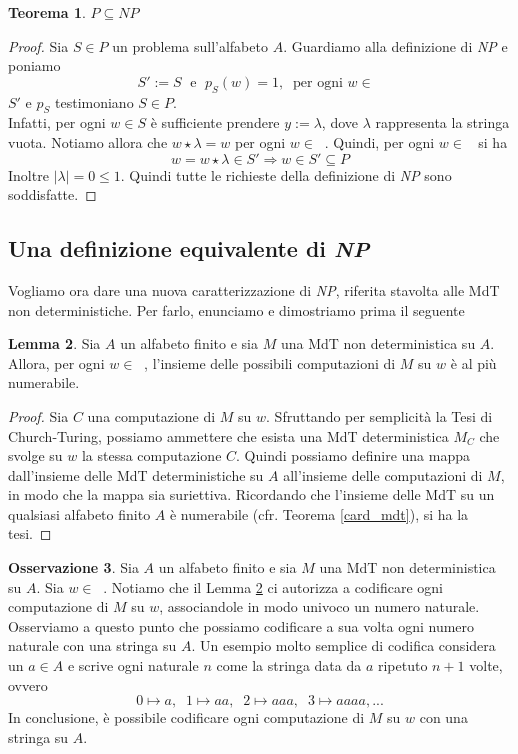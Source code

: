 \documentclass[12pt,a4paper]{report}
\theoremstyle{definition}
\newtheorem{teo}{Teorema}[section]  %
\newtheorem{oss}[teo]{Osservazione}  %
\newtheorem{lemma}[teo]{Lemma}  %
\DeclareMathOperator{\aaa}{\textit{A}^{\star}}
\begin{document}
\begin{teo}\label{P_in_NP}
$P \subseteq NP$
\begin{proof}
Sia $S \in P$ un problema sull'alfabeto $A$. Guardiamo alla definizione di \emph{NP} e poniamo
$$S':=S \; \text{ e } \; p_S(w)=1, \; \; \text{per ogni } w \in \aaa$$
$S'$ e $p_S$ testimoniano $S \in P$.\\
Infatti, per ogni $w \in S$ è sufficiente prendere $y:= \lambda$, dove $\lambda$ rappresenta la stringa vuota. Notiamo allora che $w \star \lambda = w$ per ogni $w \in \aaa$. Quindi, per ogni $w \in \aaa$ si ha 
$$w=w \star \lambda \in S' \Longrightarrow w \in S' \subseteq P$$ 
Inoltre $|\lambda|=0 \leq 1$. Quindi tutte le richieste della definizione di \emph{NP} sono soddisfatte.
\end{proof}
\end{teo}


\subsection{Una definizione equivalente di \emph{NP}}

Vogliamo ora dare una nuova caratterizzazione di \emph{NP}, riferita stavolta alle MdT non deterministiche. Per farlo, enunciamo e dimostriamo prima il seguente

\begin{lemma}\label{codifica}
Sia $A$ un alfabeto finito e sia $M$ una MdT non deterministica su $A$. Allora, per ogni $w \in \aaa$, l'insieme delle possibili computazioni di $M$ su $w$ è al più numerabile.
\begin{proof}
Sia $C$ una computazione di $M$ su $w$. Sfruttando per semplicità la Tesi di Church-Turing, possiamo ammettere che esista una MdT deterministica $M_C$ che svolge su $w$ la stessa computazione $C$. Quindi possiamo definire una mappa dall'insieme delle MdT deterministiche su $A$ all'insieme delle computazioni di $M$, in modo che la mappa sia suriettiva. Ricordando che l'insieme delle MdT su un qualsiasi alfabeto finito $A$ è numerabile (cfr. Teorema \ref{card_mdt}), si ha la tesi.
\end{proof}
\end{lemma}

\begin{oss}\label{oss_codifica}
Sia $A$ un alfabeto finito e sia $M$ una MdT non deterministica su $A$. Sia $w \in \aaa$. Notiamo che il Lemma \ref{codifica} ci autorizza a codificare ogni computazione di $M$ su $w$, associandole in modo univoco un numero naturale. Osserviamo a questo punto che possiamo codificare a sua volta ogni numero naturale con una stringa su $A$. Un esempio molto semplice di codifica considera un $a \in A$ e scrive ogni naturale $n$ come la stringa data da $a$ ripetuto $n+1$ volte, ovvero
$$0 \mapsto a, \; \; 1 \mapsto aa, \; \; 2 \mapsto aaa, \; \; 3 \mapsto aaaa, ...$$
In conclusione, è possibile codificare ogni computazione di $M$ su $w$ con una stringa su $A$.
\end{oss}
\end{document}
